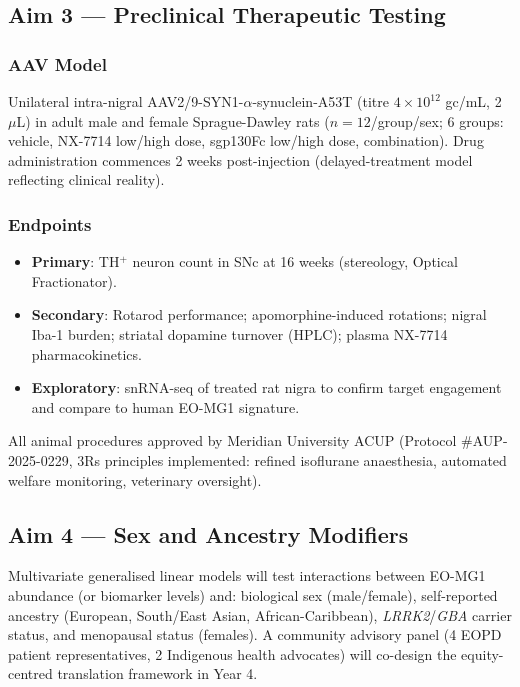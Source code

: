 \subsection{Aim 3 --- Preclinical Therapeutic Testing}

\subsubsection{AAV Model}
Unilateral intra-nigral AAV2/9-SYN1-$\alpha$-synuclein-A53T (titre $4\times10^{12}$ gc/mL, 2 $\mu$L) in adult male and female Sprague-Dawley rats ($n=12$/group/sex; 6 groups: vehicle, NX-7714 low/high dose, sgp130Fc low/high dose, combination). Drug administration commences 2 weeks post-injection (delayed-treatment model reflecting clinical reality).

\subsubsection{Endpoints}
\begin{itemize}[leftmargin=16pt, itemsep=2pt, topsep=2pt]
  \item \textbf{Primary}: TH$^{+}$ neuron count in SNc at 16 weeks (stereology, Optical Fractionator).
  \item \textbf{Secondary}: Rotarod performance; apomorphine-induced rotations; nigral Iba-1 burden; striatal dopamine turnover (HPLC); plasma NX-7714 pharmacokinetics.
  \item \textbf{Exploratory}: snRNA-seq of treated rat nigra to confirm target engagement and compare to human EO-MG1 signature.
\end{itemize}

All animal procedures approved by Meridian University ACUP (Protocol \#AUP-2025-0229, 3Rs principles implemented: refined isoflurane anaesthesia, automated welfare monitoring, veterinary oversight).

\subsection{Aim 4 --- Sex and Ancestry Modifiers}

Multivariate generalised linear models will test interactions between EO-MG1 abundance (or biomarker levels) and: biological sex (male/female), self-reported ancestry (European, South/East Asian, African-Caribbean), \textit{LRRK2}/\textit{GBA} carrier status, and menopausal status (females). A community advisory panel (4 EOPD patient representatives, 2 Indigenous health advocates) will co-design the equity-centred translation framework in Year 4.

